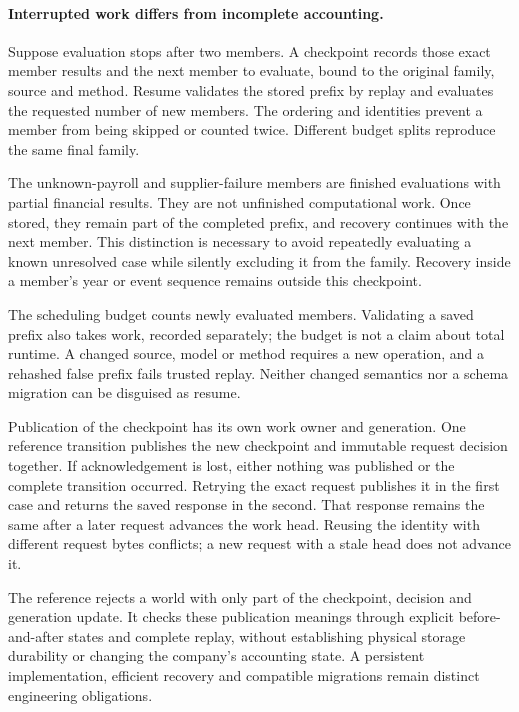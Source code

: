 \paragraph{Interrupted work differs from incomplete accounting.}
Suppose evaluation stops after two members. A checkpoint records those exact
member results and the next member to evaluate, bound to the original family,
source and method. Resume validates the stored prefix by replay and evaluates
the requested number of new members. The ordering and identities prevent a
member from being skipped or counted twice. Different budget splits reproduce
the same final family.

The unknown-payroll and supplier-failure members are finished evaluations with
partial financial results. They are not unfinished computational work. Once
stored, they remain part of the completed prefix, and recovery continues with
the next member. This distinction is necessary to avoid repeatedly evaluating
a known unresolved case while silently excluding it from the family. Recovery
inside a member's year or event sequence remains outside this checkpoint.

The scheduling budget counts newly evaluated members. Validating a saved
prefix also takes work, recorded separately; the budget is not a claim about
total runtime. A changed source, model or method requires a new operation,
and a rehashed false prefix fails trusted replay. Neither changed semantics
nor a schema migration can be disguised as resume.

Publication of the checkpoint has its own work owner and generation. One
reference transition publishes the new checkpoint and immutable request
decision together. If acknowledgement is lost, either nothing was published
or the complete transition occurred. Retrying the exact request publishes it
in the first case and returns the saved response in the second. That response
remains the same after a later request advances the work head. Reusing the
identity with different request bytes conflicts; a new request with a stale
head does not advance it.

The reference rejects a world with only part of the checkpoint, decision and
generation update. It checks these publication meanings through explicit
before-and-after states and complete replay, without establishing physical
storage durability or changing the company's accounting state. A persistent
implementation, efficient recovery and compatible migrations remain distinct
engineering obligations.

